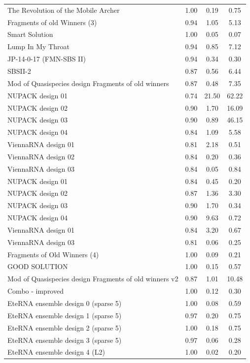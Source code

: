 \documentclass[letter]{bioinfo}
\begin{document}
\begin{center}
\begin{longtable}{l ccc}
The Revolution of the Mobile Archer	&1.00 	&0.19 	&0.75 \\
Fragments of old Winners (3)	&0.94 	&1.05 	&5.13 \\
Smart Solution				&1.00 	&0.05 	&0.07 \\
Lump In My Throat				&0.94 	&0.85 	&7.12 \\
JP-14-0-17 (FMN-SBS II)		&0.94 	&0.34 	&0.30 \\
SBSII-2						&0.87 	&0.56 	&6.44 \\
Mod of Quasispecies design Fragments of old winners	&0.87 	&0.48 	&7.35 \\
NUPACK design 01				&0.74 	&21.50 	&62.22 \\
NUPACK design 02				&0.90 	&1.70 	&16.09 \\
NUPACK design 03				&0.90 	&0.89 	&46.15 \\
NUPACK design 04				&0.84 	&1.09 	&5.58 \\
ViennaRNA design 01			&0.81 	&2.18 	&0.51 \\
ViennaRNA design 02			&0.84 	&0.20 	&0.36 \\
ViennaRNA design 03			&0.84 	&0.05 	&0.84 \\
NUPACK design 01				&0.84 	&0.45 	&0.20 \\
NUPACK design 02				&0.87 	&1.36 	&3.30 \\
NUPACK design 03				&0.90 	&1.70 	&0.34 \\
NUPACK design 04				&0.90 	&9.63 	&0.72 \\
ViennaRNA design 01			&0.84 	&3.20 	&0.67 \\
ViennaRNA design 03			&0.81 	&0.06 	&0.25 \\
Fragments of Old Winners (4)	&1.00 	&0.09 	&0.21 \\
GOOD SOLUTION					&1.00 	&0.15 	&0.57 \\
Mod of Quasispecies design Fragments of old winners v2		&0.87 	&1.01 	 &10.48 \\
Combo - improved				&1.00 	&0.12 	&0.30 \\
EteRNA ensemble design 0 (sparse 5) 		&1.00 	&0.08 	&0.59 \\
EteRNA ensemble design 1 (sparse 5)		&0.97 	&0.20 	&0.75 \\
EteRNA ensemble design 2 (sparse 5)		&1.00 	&0.18 	&0.75 \\
EteRNA ensemble design 3 (sparse 5)		&0.97 	&0.06 	&0.28 \\
EteRNA ensemble design 4 (L2)		&1.00 	&0.02 	&0.20 \\

\end{longtable}
\end{center}
\end{document}
